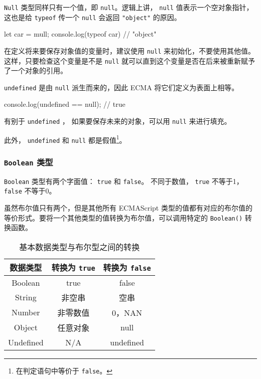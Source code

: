 \texttt{Null} 类型同样只有一个值，即 \texttt{null}。逻辑上讲， \texttt{null} 值表示一个空对象指针，这也是给 \texttt{typeof} 传一个 \texttt{null} 会返回 \texttt{"object"} 的原因。

\begin{JavaScript}
let car = mull;
console.log(typeof car)     // "object"
\end{JavaScript}

在定义将来要保存对象值的变量时，建议使用 \texttt{null} 来初始化，不要使用其他值。这样，只要检查这个变量是不是 \texttt{null} 就可以直到这个变量是否在后来被重新赋予了一个对象的引用。

\texttt{undefined} 是由 \texttt{null} 派生而来的，因此 ECMA 将它们定义为表面上相等。

\begin{JavaScript}
console.log(undefined == null);     // true
\end{JavaScript}

有别于 \texttt{undefined} ， 如果要保存未来的对象，可以用 \texttt{null} 来进行填充。

此外， \texttt{undefined} 和 \texttt{null} 都是假值\footnote{在判定语句中等价于 \texttt{false}。 }。

\subsubsection{\texttt{Boolean} 类型}

\texttt{Boolean} 类型有两个字面值： \texttt{true} 和 \texttt{false}。 不同于数值， \texttt{true} 不等于1， \texttt{false} 不等于0。

虽然布尔值只有两个，但是其他所有 ECMAScript 类型的值都有对应的布尔值的等价形式。要将一个其他类型的值转换为布尔值，可以调用特定的 \texttt{Boolean()} 转换函数。

\begin{table}[H]
    \centering
    \small
    \caption{基本数据类型与布尔型之间的转换}
    \label{table:基本数据类型与布尔型之间的转换}
    \setlength{\tabcolsep}{18mm}
    \begin{tabular}{c|cc}
        \toprule
        \textbf{数据类型} & \textbf{转换为 \texttt{true}} & \textbf{转换为 \texttt{false}} \\
        \midrule
        Boolean & true & false\\
        String & 非空串 & 空串 \\
        Number & 非零数值 & 0，NAN \\
        Object & 任意对象 & null \\
        Undefined & N/A & undefined \\
        \bottomrule
    \end{tabular}
\end{table}

